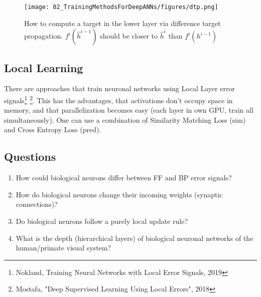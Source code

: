 \documentclass[main]{subfiles}
\begin{document}
\begin{figure}[H]
	\centering
	\texttt{[image: 02\_TrainingMethodsForDeepANNs/figures/dtp.png]}
	\caption{How to compute a target in the lower layer via difference target propagation. $f^i( \hat{h}^{i-1})$ should be closer to $\hat{h}^i$ than $f^i(h^{i-1})$}
	\label{fig:targetprop}
\end{figure}



\subsection{Local Learning}
There are approaches that train neuronal networks using Local Layer error signals\footnote{Nokland, Training Neural Networks with Local Error Signals, 2019} \footnote{Mostafa, "Deep Supervised Learning Using Local Errors", 2018}. This has the advantages, that activations don't occupy space in memory, and that parallelization becomes easy (each layer in own GPU, train all simultaneously). One can use a combination of Similarity Matching Loss (sim) and Cross Entropy Loss (pred).

\subsection{Questions}
\begin{enumerate}
    \item How could biological neurons differ between FF and BP error signals?
    \item How do biological neurons change their incoming weights (synaptic connections)?
    \item Do biological neurons follow a purely local update rule?
    \item What is the depth (hierarchical layers) of biological neuronal networks of the human/primate visual system?
\end{enumerate}
\end{document}

